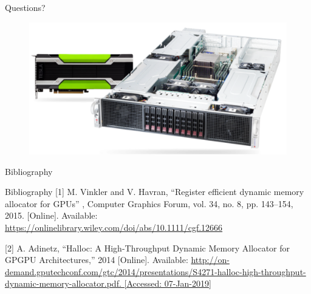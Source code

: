 \documentclass[10pt]{beamer}
\begin{document}
\begin{frame}[fragile]{Questions?}

\begin{figure}
  \centering
    \includegraphics[width=\textwidth]{images/gpx.png}
\end{figure}

\end{frame}

\begin{frame}[fragile]{Bibliography}

\begin{alertblock}{Bibliography}
[1] M. Vinkler and V. Havran, “Register efficient dynamic memory allocator for GPUs” , Computer Graphics Forum, vol. 34, no. 8, pp. 143–154, 2015. [Online]. Available: \url{https://onlinelibrary.wiley.com/doi/abs/10.1111/cgf.12666}

[2] A. Adinetz, “Halloc: A High-Throughput Dynamic Memory Allocator for GPGPU Architectures,” 2014 [Online]. Available:
\url{http://on-demand.gputechconf.com/gtc/2014/presentations/S4271-halloc-high-throughput-dynamic-memory-allocator.pdf. [Accessed: 07-Jan-2019]}
\end{alertblock}

\end{frame}
\end{document}
